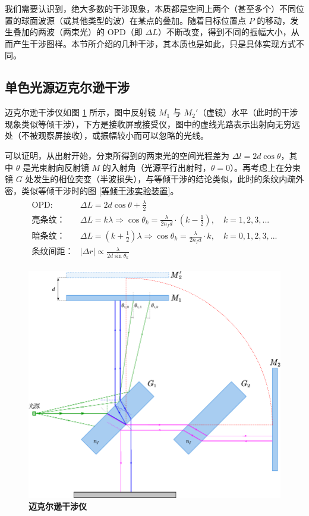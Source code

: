 \documentclass[UTF8]{report}
\theoremstyle{MyLineTheoremStyle} %
\theoremstyle{MyBlockTheoremStyle} %
\theoremstyle{MySubsubsectionStyle} %
\begin{document}
我们需要认识到，绝大多数的干涉现象，本质都是空间上两个（甚至多个）不同位置的球面波源（或其他类型的波）在某点的叠加。随着目标位置点 $P$ 的移动，发生叠加的两波（两束光）的 OPD（即 $\Delta L$）不断改变，得到不同的振幅大小，从而产生干涉图样。本节所介绍的几种干涉，其本质也是如此，只是具体实现方式不同。

\subsection{单色光源迈克尔逊干涉}

迈克尔逊干涉仪如图 \ref{迈克尔逊干涉仪} 所示，图中反射镜 $M_1$ 与 $M_2'$（虚镜）水平（此时的干涉现象类似等倾干涉），下方是接收屏或接受仪，图中的虚线光路表示出射向无穷远处（不被观察屏接收），或振幅较小而可以忽略的光线。

可以证明，从出射开始，分束所得到的两束光的空间光程差为 $\Delta l = 2 d \cos \theta$，其中 $\theta$ 是光束射向反射镜 $M$ 的入射角（光源平行出射时，$\theta = 0$）。再考虑上在分束镜 $G$ 处发生的相位突变（半波损失），与等倾干涉的结论类似，此时的条纹内疏外密，类似等倾干涉时的图 \ref{等倾干涉实验装置}。
\begin{align}
\begin{matrix}
\displaystyle \text{OPD: }& \Delta L = 2 d \cos \theta + \frac{\lambda}{2} \\ 
\displaystyle \text{亮条纹：}&\Delta L = k \lambda \Longrightarrow \cos \theta_k = \frac{\lambda}{2 n_f d} \cdot (k - \frac{1}{2}),\quad k = 1, 2, 3, ... \\ 
\displaystyle \text{暗条纹：}&\Delta L = (k + \frac{1}{2}) \lambda \Longrightarrow \cos \theta_k = \frac{\lambda}{2 n_f d} \cdot k,\quad k = 0, 1, 2, 3, ...\\ 
\displaystyle \text{条纹间距：}& | \Delta r | \propto  \frac{\lambda}{2d \sin \theta_k}
\end{matrix}
\end{align}


\begin{figure}[H]\centering
    \includegraphics[width=0.8\columnwidth]{assets/3/迈克尔逊干涉仪.pdf}
    \caption{\bfseries 迈克尔逊干涉仪}\label{迈克尔逊干涉仪}
\end{figure}
\end{document}
